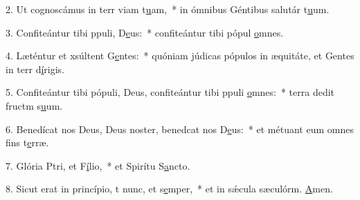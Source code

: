 2. Ut cognoscámus in terr viam t\uline{u}am,~* in ómnibus Géntibus salutár t\uline{u}um.\par 
3. Confiteántur tibi ppuli, D\uline{e}us:~* confiteántur tibi pópul \uline{o}mnes.\par 
4. Læténtur et xsúltent G\uline{e}ntes:~* quóniam júdicas pópulos in æquitáte, et Gentes in terr d\uline{í}rigis.\par 
5. Confiteántur tibi pópuli, Deus, confiteántur tibi ppuli \uline{o}mnes:~* terra dedit fructm s\uline{u}um.\par 
6. Benedícat nos Deus, Deus noster, benedcat nos D\uline{e}us:~* et métuant eum omnes fins t\uline{e}rræ.\par 
7. Glória Ptri, et F\uline{í}lio,~* et Spirítu S\uline{a}ncto.\par 
8. Sicut erat in princípio, t nunc, et s\uline{e}mper,~* et in sǽcula sæculórm. \uline{A}men.\par 
